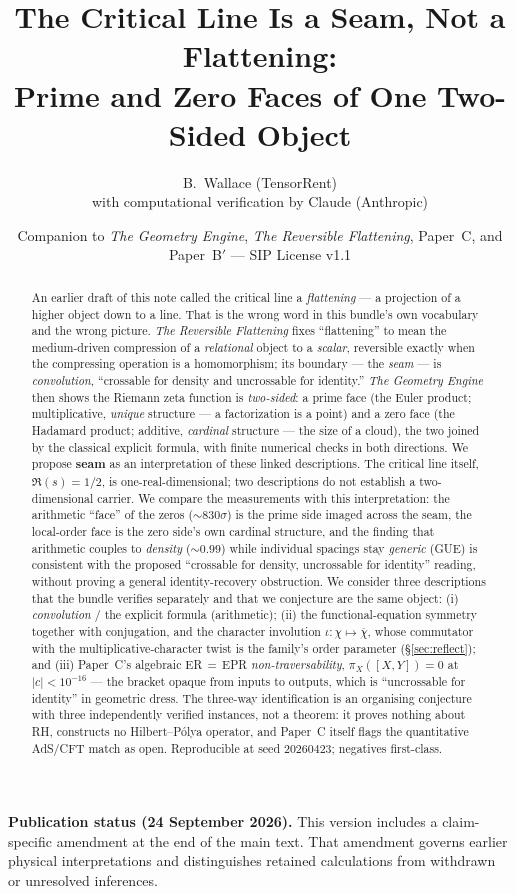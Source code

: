 \documentclass[11pt]{article}
\title{\textbf{The Critical Line Is a Seam, Not a Flattening:\\
Prime and Zero Faces of One Two-Sided Object}}
\author{B.\ Wallace \quad (TensorRent)\\ \small with computational verification by Claude (Anthropic)}
\date{\small Companion to \textit{The Geometry Engine}, \textit{The Reversible Flattening},
Paper~C, and Paper~B$'$ --- SIP License v1.1}
\theoremstyle{definition}
\theoremstyle{plain}
\newcommand{\zbar}{\overline{\chi}}
\begin{document}
\maketitle

\begin{abstract}
An earlier draft of this note called the critical line a \emph{flattening} --- a projection
of a higher object down to a line. That is the wrong word in this bundle's own vocabulary and
the wrong picture. \textit{The Reversible Flattening} fixes ``flattening'' to mean the
medium-driven compression of a \emph{relational} object to a \emph{scalar}, reversible exactly
when the compressing operation is a homomorphism; its boundary --- the \emph{seam} --- is
\emph{convolution}, ``crossable for density and uncrossable for identity.'' \textit{The Geometry
Engine} then shows the Riemann zeta function is \emph{two-sided}: a prime face (the Euler
product; multiplicative, \emph{unique} structure --- a factorization is a point) and a zero
face (the Hadamard product; additive, \emph{cardinal} structure --- the size of a cloud), the
two joined by the classical explicit formula, with finite numerical checks in both directions.
We propose \textbf{seam} as an interpretation of these linked descriptions.
The critical line itself, $\Re(s)=1/2$, is one-real-dimensional; two descriptions
do not establish a two-dimensional carrier. We compare the measurements with this interpretation: the
arithmetic ``face'' of the zeros ($\sim\!830\sigma$) is the prime side imaged across the seam,
the local-order face is the zero side's own cardinal structure, and the finding that arithmetic
couples to \emph{density} ($\sim\!0.99$) while individual spacings stay \emph{generic} (GUE) is
consistent with the proposed ``crossable for density, uncrossable for identity'' reading,
without proving a general identity-recovery obstruction. We consider
three descriptions that the bundle verifies separately and that we conjecture are the same
object: (i) \emph{convolution} / the explicit formula (arithmetic); (ii) the
functional-equation symmetry together with conjugation, and the character involution
$\iota:\chi\mapsto\zbar$, whose
commutator with the multiplicative-character twist is the family's order parameter
(\S\ref{sec:reflect}); and (iii) Paper~C's algebraic ER$\,=\,$EPR \emph{non-traversability},
$\pi_X([X,Y])=0$ at $|c|<10^{-16}$ --- the bracket opaque from inputs to outputs, which is
``uncrossable for identity'' in geometric dress. The three-way identification is an organising
conjecture with three independently verified instances, not a theorem: it proves nothing about
RH, constructs no Hilbert--P\'olya operator, and Paper~C itself flags the quantitative AdS/CFT
match as open. Reproducible at seed $20260423$; negatives first-class.
\end{abstract}
\par\smallskip\noindent\textbf{Publication status (24 September 2026).}
This version includes a claim-specific amendment at the end of the main text.
That amendment governs earlier physical interpretations and distinguishes
retained calculations from withdrawn or unresolved inferences.\par\smallskip
\end{document}

